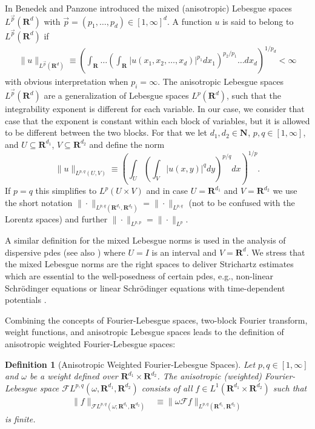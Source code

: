 \documentclass[a4paper]{article}
\newcommand{\nn}[1]{\mathbf{N}^{#1}}
\newcommand{\rr}[1]{\mathbf{R}^{#1}}
\newcommand{\rrI}{\rr{d_1}}
\newcommand{\rrII}{\rr{d_2}}
\newcommand{\rrIxII}{\rrI\times\rrII}
\newcommand{\abs}[1]{| #1|}     %
\newcommand{\norm}[2]{\|#1\|_{#2}}
\newcommand{\F}[0]{\mathscr{F}}
\newcommand{\FL}[1]{\F L^{#1}}
\numberwithin{equation}{section}
\newtheorem{definition}[theorem]{Definition}
\theoremstyle{remark}
\begin{document}
In \cite{Benedek61SpaceMixedNorm} Benedek and Panzone
introduced the mixed (anisotropic) Lebesgue spaces
$L^{ \overrightarrow{p}}(\rr{d})$ 
with $\overrightarrow{p} = (p_1, \dots, p_d)\in [1,\infty]^d$.
A function $u$ is said to belong to $L^{ \overrightarrow{p}}(\rr{d})$
if
\begin{align*}
\norm{u}{L^{ \overrightarrow{p}}(\rr{d})}
\equiv
\left(
\int_{\rr{}}\dots
    \left(
        \int_{\rr{}}|u(x_1,x_2,\dots,x_d)|^{p_1} dx_1
    \right)^{{p_2}/{p_1}}
\dots dx_d
\right)^{{1}/{p_d}}<\infty
\end{align*}
with obvious interpretation when $p_i = \infty$.
The anisotropic Lebesgue spaces
$L^{ \overrightarrow{p}}(\rr{d})$ are a generalization of 
Lebesgue spaces $L^{p}(\rr{d})$,
such that the integrability exponent is different for each variable.
In our case, we consider that case that the
exponent is constant within each block of variables,
but it is allowed to be different between the two blocks.
For that we let $d_1,d_2 \in \nn{}$, $p, q\in [1,\infty]$, and $U\subseteq\rrI$, $V\subseteq\rrII$
and define the norm
\begin{equation}\label{eq:mixed_norm_definition}
\norm{u}{L^{p, q}(U,V)}
\equiv
\left(\int_{U}
\left(\int_{V}\abs{u(x, y)}^q d y\right)^{p / q}
    d x\right)^{1 / p}.
\end{equation}
If $p=q$ this simplifies to $ L^{p}(U\times V)$
and in case $U=\rrI$ and $V=\rrII$ we use the short notation
$\norm{\cdot}{L^{p, q}(\rr{d_1},\rr{d_2})}=\norm{\cdot}{L^{p, q}}$
(not to be confused with the Lorentz spaces)
and further $\norm{\cdot}{L^{p, p}}=\norm{\cdot}{L^{p}}$.

A similar definition for the mixed Lebesgue norms
is used in the analysis of dispersive \glspl{pde} 
\cite{Tao06NonlinearDispersiveEquations} (see also \cite{Sogge13LecturesNonlinearWave}) where $U=I$ is an interval and $V=\rr{d}$.
We stress that the mixed Lebesgue norms
are the right spaces to deliver Strichartz estimates
which are essential to the well-posedness of certain \glspl{pde},
e.g., non-linear Schrödinger equations
or linear Schrödinger equations with time-dependent potentials \cite{Keel98EndpointStrichartzEstimates,Ginibre95GeneralizedStrichartzInequalities}.

Combining the concepts of Fourier-Lebesgue spaces, two-block Fourier transform, weight functions, and anisotropic Lebesgue spaces leads to the definition of anisotropic weighted Fourier-Lebesgue spaces:
\begin{definition}[Anisotropic Weighted Fourier-Lebesgue Spaces]
\label{def:weighted_FL_mixed}
Let $p, q\in [1,\infty ]$ and $\omega$
be a weight defined over $\rrIxII$.
The anisotropic (weighted) Fourier-Lebesgue space
$\mathscr{F}L^{p, q}(\omega , \rrI,\rrII)$ 
consists of all
$f\in L^1(\rr{d_1} \times \rr{d_2})$ 
such that
\begin{equation}\label{FLnorm}
\begin{aligned}
	\norm{f}{\FL{p, q}(\omega;\rrI,\rrII)}
    &\equiv \norm{\omega\mathscr{F} f}{L^{p, q}(\rr{d_1}, \rr{d_2} )}
\end{aligned}
\end{equation}
is finite.    
\end{definition}
\end{document}
